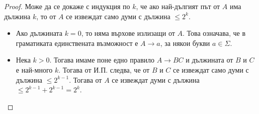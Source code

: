 \begin{proof}
  Може да се докаже с индукция по $k$, че ако най-дългият път от $A$ има дължина $k$, то от $A$ се извеждат само думи с дължина $\leq 2^k$.
  \begin{itemize}
  \item
    Ако дължината $k = 0$, то няма върхове излизащи от $A$. Това означава, че в граматиката единствената възможност е $A \to a$, за някои букви $a \in \Sigma$.
  \item
    Нека $k > 0$. Тогава имаме поне едно правило $A \to BC$ и дължината от $B$ и $C$ е най-много $k$.
    Тогава от И.П. следва, че от $B$ и $C$ се извеждат само думи с дължина $\leq 2^{k-1}$. Тогава от $A$ се извеждат думи с дължина $\leq 2^{k-1} + 2^{k-1} = 2^k$.
  \end{itemize}
\end{proof}




